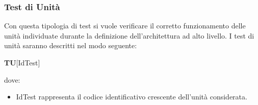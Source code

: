 \subsubsection{Test di Unità}
Con questa tipologia di test si vuole verificare il corretto funzionamento delle unità individuate durante la definizione dell'architettura ad alto livello.
I test di unità saranno descritti nel modo seguente:
\begin{center}
\textbf{TU}[IdTest]
\end{center}
dove:
\begin{itemize}
\item IdTest rappresenta il codice identificativo crescente dell'unità considerata.
\end{itemize}
